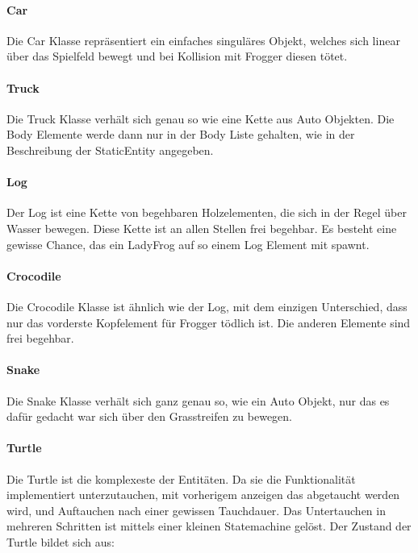 \documentclass[a4paper,10pt]{report}
\begin{document}
{{{				\paragraph{Car}
				{
					Die Car Klasse repräsentiert ein einfaches singuläres Objekt, welches sich linear über das Spielfeld bewegt und bei Kollision mit Frogger diesen tötet.
				}					
				
				\paragraph{Truck}
				{
					Die Truck Klasse verhält sich genau so wie eine Kette aus Auto Objekten. 
					Die Body Elemente werde dann nur in der Body Liste gehalten, wie in der Beschreibung der StaticEntity angegeben.
				}				
					
				\paragraph{Log}
				{
					Der Log ist eine Kette von begehbaren Holzelementen, die sich in der Regel über Wasser bewegen.
					Diese Kette ist an allen Stellen frei begehbar. Es besteht eine gewisse Chance, das ein LadyFrog auf so einem Log Element mit spawnt.
				}	
				
				\paragraph{Crocodile}
				{
					Die Crocodile Klasse ist ähnlich wie der Log, mit dem einzigen Unterschied, dass nur das vorderste Kopfelement für Frogger tödlich ist. 
					Die anderen Elemente sind frei begehbar.
				}									

				\paragraph{Snake}
				{
					Die Snake Klasse verhält sich ganz genau so, wie ein Auto Objekt, nur das es dafür gedacht war sich über den Grasstreifen zu bewegen.
				}

				\paragraph{Turtle}
				{
					Die Turtle ist die komplexeste der Entitäten. Da sie die Funktionalität implementiert unterzutauchen, mit vorherigem anzeigen das abgetaucht werden wird, und Auftauchen nach einer gewissen Tauchdauer. 
					Das Untertauchen in mehreren Schritten ist mittels einer kleinen Statemachine gelöst.
					\newline \newline
					Der Zustand der Turtle bildet sich aus:
							
}}}}
\end{document}
